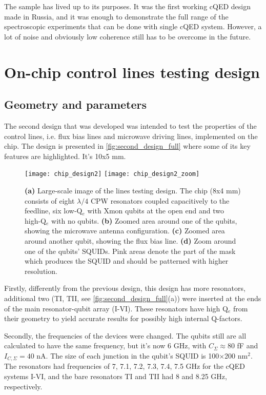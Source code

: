\documentclass[12pt, twoside]{report}
\numberwithin{equation}{section}
\begin{document}
The sample has lived up to its purposes. It was the first working cQED design made in Russia, and it was enough to demonstrate the full range of the spectroscopic experiments that can be done with single cQED system. However, a lot of noise and obviously low coherence still has to be overcome in the future.

\newpage

\section{On-chip control lines testing design}

\subsection{Geometry and parameters}

The second design that was developed was intended to test the properties of the control lines, i.e. flux bias lines and microwave driving lines, implemented on the chip. The design is presented in \autoref{fig:second_design_full} where some of its key features are highlighted. It's 10x5 mm.

\begin{figure}[h!]
\centering
\texttt{[image: chip\_design2]}
\texttt{[image: chip\_design2\_zoom]}
\caption{\textbf{(a)} Large-scale image of the lines testing design. The chip (8x4 mm) consists of eight $\lambda/4$ CPW resonators coupled capacitively to the feedline, six low-Q$_e$ with Xmon qubits at the open end and two high-Q$_e$ with no qubits. \textbf{(b)} Zoomed area around one of the qubits, showing the microwave antenna configuration. \textbf{(c)} Zoomed area around another qubit, showing the flux bias line. \textbf{(d)} Zoom around one of the qubits' SQUIDs. Pink areas denote the part of the mask which produces the SQUID and should be patterned with higher resolution.}
\label{fig:second_design_full}
\end{figure}

Firstly, differently from the previous design, this design has more resonators, additional two (TI, TII, see \autoref{fig:second_design_full}(a)) were inserted at the ends of the main resonator-qubit array (I-VI). These resonators have high Q$_e$ from their geometry to yield accurate results for possibly high internal Q-factors.

Secondly, the frequencies of the devices were changed. The qubits still are all calculated to have the same frequency, but it's now 6 GHz, with $C_\Sigma \approx 80$ fF and $I_{C, \Sigma} = 40$ nA. The size of each junction in the qubit's SQUID is 100$\times$200 nm$^2$. The resonators had frequencies of 7, 7.1, 7.2, 7.3, 7.4, 7.5 GHz for the cQED systems I-VI, and the bare resonators TI and TII had 8 and 8.25 GHz, respectively.
\end{document}
